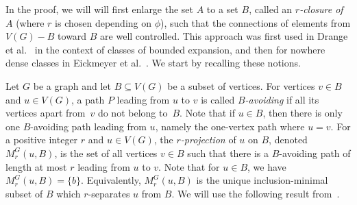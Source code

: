 %
In the proof, we will
will first enlarge the set $A$ to a set $B$, called
an \emph{$r$-closure of~$A$} (where $r$ is chosen depending on $\phi$), such 
that the connections of elements from $V(G)-B$ 
toward $B$ are well controlled. This approach
was first used in Drange et al.~\cite{drange2016kernelization} in the context of classes of bounded expansion, 
and then for nowhere dense classes in Eickmeyer et al.~\cite{eickmeyer2016neighborhood}. 
We start by recalling these notions.

Let $G$ be a graph and let $B\subseteq V(G)$ be a subset of vertices. For vertices $v\in B$ and $u\in V(G)$, a path $P$ leading from $u$ to $v$ is called {\em{$B$-avoiding}}
if all its vertices apart from~$v$ do not belong to~$B$. Note that if $u\in B$, then there is only one $B$-avoiding path leading from $u$, namely the one-vertex path where $u=v$.
For a positive integer $r$ and $u\in V(G)$, the {\em{$r$-projection}} of $u$ on $B$, denoted $M^G_r(u,B)$, is the set of all vertices $v\in B$ such that there is
a $B$-avoiding path of length at most $r$ leading from $u$ to $v$. Note that for $u\in B$, we have $M^G_r(u,B)=\{b\}$.
Equivalently, $M^G_r(u,B)$ is the unique inclusion-minimal
subset of $B$ which $r$-separates $u$ from $B$.
%
%
We will use the following result from~\cite{eickmeyer2016neighborhood}.

